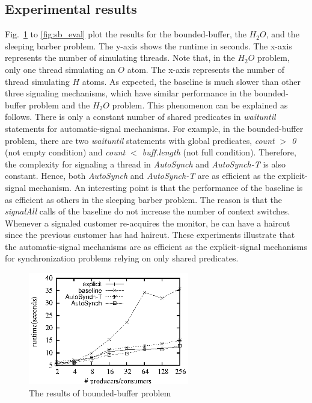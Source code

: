 \documentclass[preprint]{sigplanconf}
\begin{document}
\subsection{Experimental results}


Fig.~\ref{fig:pc_eval} to \ref{fig:sb_eval} plot the results for the
bounded-buffer, the $H_2O$, and the sleeping barber problem. The y-axis shows
the runtime in seconds. The x-axis represents the number of simulating threads. 
Note that, in the $H_2O$ problem, only one thread simulating an $O$ atom. The
x-axis represents the number of thread simulating $H$ atoms. 
As expected, 
the baseline is much slower than other three signaling mechanisms, which have
similar performance in the bounded-buffer problem and the $H_2O$ problem. This 
phenomenon can be explained as follows. There is only a constant number of
shared predicates in {\em waituntil} statements for automatic-signal mechanisms.  
For example, in the bounded-buffer problem, there are two {\em waituntil} statements 
with global predicates, {\em count $>$ 0} (not empty condition) and {\em count
$<$ buff.length} (not full condition). Therefore, the 
complexity for signaling a thread in {\em AutoSynch} and {\em AutoSynch-T} is 
also constant. Hence, both {\em AutoSynch} and {\em AutoSynch-T} are as 
efficient as the explicit-signal mechanism. An interesting point is that the
performance of the baseline is as efficient as others in the sleeping barber
problem. The reason is that the {\em signalAll} calls of the baseline do not
increase the number of context switches. Whenever a signaled customer
re-acquires the monitor, he can have a haircut since the previous customer has
had haircut. These experiments illustrate that the automatic-signal mechanisms
are as efficient as the explicit-signal mechanisms for synchronization 
problems relying on only shared predicates. 

\begin{figure}[ht!]
  \centering
  \includegraphics[width=70mm]{fig/pc.eps}
  \caption{The results of bounded-buffer problem}
  \label{fig:pc_eval}
\end{figure}
\end{document}
